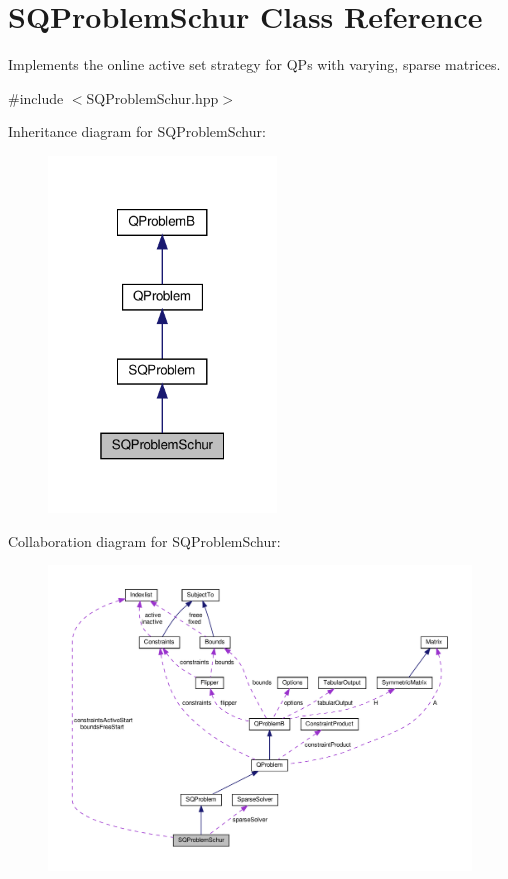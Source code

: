 \hypertarget{class_s_q_problem_schur}{}\section{S\+Q\+Problem\+Schur Class Reference}
\label{class_s_q_problem_schur}


Implements the online active set strategy for Q\+Ps with varying, sparse matrices.  




{\ttfamily \#include $<$S\+Q\+Problem\+Schur.\+hpp$>$}



Inheritance diagram for S\+Q\+Problem\+Schur\+:
\nopagebreak
\begin{figure}[H]
\begin{center}
\leavevmode
\includegraphics[width=172pt]{class_s_q_problem_schur__inherit__graph}
\end{center}
\end{figure}


Collaboration diagram for S\+Q\+Problem\+Schur\+:
\nopagebreak
\begin{figure}[H]
\begin{center}
\leavevmode
\includegraphics[width=350pt]{class_s_q_problem_schur__coll__graph}
\end{center}
\end{figure}
